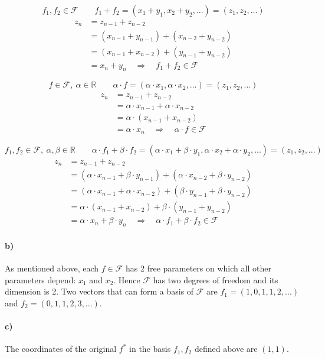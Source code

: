 \documentclass[10pt,letter]{article}
\newcommand{\R}{\mathbb{R}}
\begin{document}
\[
f_1, f_2 \in \mathcal{F} \qquad f_1 + f_2 = (x_1 + y_1, x_2 + y_2, ...) = (z_1, z_2, ...)
\]
\begin{align*}
z_n &= z_{n-1} + z_{n-2} \\
&= (x_{n-1} + y_{n-1}) + (x_{n-2} + y_{n-2}) \\
&= (x_{n-1} + x_{n-2}) + (y_{n-1} + y_{n-2}) \\
&= x_{n} + y_{n} \quad \Rightarrow \quad f_1+f_2 \in \mathcal{F}
\end{align*}

\[
f \in \mathcal{F}, \ \alpha \in \R \qquad \alpha \cdot f = (\alpha \cdot x_1, \alpha \cdot x_2, ...) = (z_1, z_2, ...)
\]
\begin{align*}
z_n &= z_{n-1} + z_{n-2} \\
&= \alpha \cdot x_{n-1} + \alpha \cdot x_{n-2} \\
&= \alpha \cdot ( x_{n-1} + x_{n-2} ) \\
&= \alpha \cdot x_{n} \quad \Rightarrow \quad \alpha \cdot f \in \mathcal{F}
\end{align*}

\[
f_1, f_2 \in \mathcal{F}, \ \alpha, \beta \in \R \qquad \alpha \cdot f_1 + \beta \cdot f_2 = (\alpha \cdot x_1 + \beta \cdot y_1, \alpha \cdot x_2 + \alpha \cdot y_2, ...) = (z_1, z_2, ...)
\]
\begin{align*}
z_n &= z_{n-1} + z_{n-2} \\
&= (\alpha \cdot x_{n-1} + \beta \cdot y_{n-1}) + (\alpha \cdot x_{n-2} + \beta \cdot y_{n-2}) \\
&= (\alpha \cdot x_{n-1} + \alpha \cdot x_{n-2}) + (\beta \cdot y_{n-1} + \beta \cdot y_{n-2}) \\
&= \alpha \cdot (x_{n-1} + x_{n-2}) + \beta \cdot (y_{n-1} + y_{n-2}) \\
&= \alpha \cdot x_{n} + \beta \cdot y_{n} \quad \Rightarrow \quad \alpha \cdot f_1 + \beta \cdot f_2 \in \mathcal{F}
\end{align*}

\paragraph{b)} As mentioned above, each $f \in \mathcal{F}$ has 2 free parameters on which all other parameters depend: $x_1$ and $x_2$. Hence $\mathcal{F}$ has two degrees of freedom and its dimension is 2. Two vectors that can form a basis of $\mathcal{F}$ are $f_1 = (1, 0, 1, 1, 2, ...)$ and $f_2 = (0, 1, 1, 2, 3, ...)$.

\paragraph{c)} The coordinates of the original $f^*$ in the basis $f_1, f_2$ defined above are $(1, 1)$.
\end{document}
